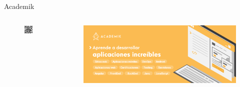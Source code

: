 \documentclass[aspectratio=169]{beamer}
\begin{document}
\begin{frame}[fragile]{Academik}
    \begin{columns}[T]
        \begin{column}[T]{2cm} %
            \begin{figure}
                \centering
                \includegraphics[width=\linewidth]{Images/qr}
            \end{figure}
        \end{column}
        \begin{column}[T]{12cm} %
            \begin{figure}
                \centering
                \includegraphics[width=\linewidth]{Images/academik}
            \end{figure}
        \end{column}
    \end{columns}
\end{frame}
\end{document}
